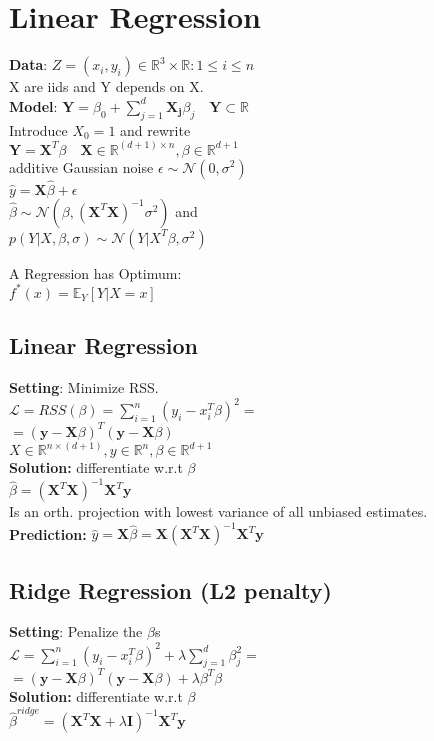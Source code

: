 \section*{Linear Regression}
\textbf{Data}:
$Z={(x_i,y_i)\in \mathbb{R}^3 \times \mathbb{R}: 1 \leq i \leq n}$\\
X are iids and Y depends on X.\\
\textbf{Model}:
$\mathbf{Y}=\beta_0 + \sum_{j=1}^d\mathbf{X_j}\beta_j \quad \mathbf{Y}\subset{\mathbb{R}}$\\
Introduce $X_0=1$ and rewrite\\
$\mathbf{Y}=\mathbf{X}^T\beta \quad \mathbf{X}\in\mathbb{R}^{(d+1)\times n}, \beta \in \mathbb{R}^{d+1}$\\
additive Gaussian noise $\epsilon \sim \mathcal{N}(0,\sigma^2)$\\
$\hat{y}=\mathbf{X}\hat{\beta}+\epsilon$\\
$\hat{\beta} \sim \mathcal{N}(\beta, (\mathbf{X}^T\mathbf{X})^{-1}\sigma^2) $ and\\
$p(Y|X,\beta, \sigma) \sim \mathcal{N}(Y|X^T\beta, \sigma^2)$

A Regression has Optimum:\\
$f^*(x) = \mathbb{E}_Y[Y|X=x]$


\subsection*{Linear Regression}
\textbf{Setting}: Minimize RSS.\\
$\mathcal{L} = RSS(\beta)=\sum_{i=1}^n(y_i-x_i^T\beta)^2=$\\
$=(\mathbf{y}-\mathbf{X}\beta)^T(\mathbf{y}-\mathbf{X}\beta)$\\
$X\in\mathbb{R}^{n\times(d+1)}, y\in\mathbb{R}^n,  \beta\in\mathbb{R}^{d+1}$\\
\textbf{Solution:} differentiate w.r.t $\beta$\\
$\hat{\beta} = (\mathbf{X}^T\mathbf{X})^{-1}\mathbf{X}^{T}\mathbf{y}$\\
Is an orth. projection with lowest variance of all unbiased estimates.\\
\textbf{Prediction:} $\hat{y}{=}\mathbf{X}\hat{\beta}{=}\mathbf{X}(\mathbf{X}^T\mathbf{X})^{-1}\mathbf{X}^{T}\mathbf{y}$


\subsection*{Ridge Regression (L2 penalty)}
\textbf{Setting}: Penalize the $\beta$s\\
$\mathcal{L} = \sum_{i=1}^n(y_i-x_i^T\beta)^2+\lambda\sum_{j=1}^d\beta_j^2 = $\\
$=(\mathbf{y}-\mathbf{X}\beta)^T(\mathbf{y}-\mathbf{X}\beta)+\lambda\beta^T\beta$\\
\textbf{Solution:} differentiate w.r.t $\beta$\\
$\hat{\beta}^{ridge} = (\mathbf{X}^T\mathbf{X}+\lambda\mathbf{I})^{-1}\mathbf{X}^{T}\mathbf{y}$


